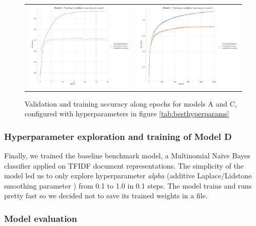 \documentclass[10pt,journal,compsoc, onecolumn]{IEEEtran}
\begin{document}
\begin{figure}[h]
\begin{tabular}{c c}
    \includegraphics[width=.502\linewidth]{images/chart_16.pdf} &
    \includegraphics[width=.498\linewidth]{images/chart_18.pdf} \\
\end{tabular}
\caption{Validation and training accuracy along epochs for models A and C, configured with hyperparameters in figure \ref{tab:besthyperparams}}
\label{fig:epochs}
\end{figure}

\subsubsection{Hyperparameter exploration and training of Model D}

Finally, we trained the baseline benchmark model, a Multinomial Naïve Bayes classifier applied on TFIDF document representations. The simplicity of the model led us to only explore hyperparameter \textit{alpha} (additive Laplace/Lidstone smoothing parameter \cite{Sklearn}) from 0.1 to 1.0 in 0.1 steps. The model trains and runs pretty fast so we decided not to save its trained weights in a file.

\subsubsection{Model evaluation}
\end{document}
